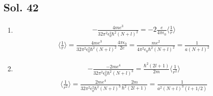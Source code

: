 \subsection*{Sol. 42}
\begin{enumerate}
    \item 
    \begin{align*}
        -\frac{4me^3}{32\pi^2\epsilon_0^2\hbar^2(N+l)^2}
        =-2\frac{e}{4\pi\epsilon_0}\langle
        \frac{1}{r}
        \rangle
    \end{align*}
    \begin{align*}
        \langle\frac{1}{r}\rangle
        =\frac{4me^3}{32\pi^2\epsilon_0^2\hbar^2(N+l)^2}
        \frac{4\pi\epsilon_0}{2e}=
        \frac{me^2}{4\pi^2\epsilon_0\hbar^2(N+l)^2}=\frac{1}{a(N+l)^2}
    \end{align*}
    \item 
    \begin{align*}
        -\frac{-2me^4}{32\pi^2\epsilon_0^2\hbar^2(N+l)^3}=
        \frac{\hbar^2(2l+1)}{2m}\langle\frac{1}{r^2}\rangle
    \end{align*}
    \begin{align*}
        \langle\frac{1}{r^2}\rangle
        =\frac{2me^4}{32\pi^2\epsilon_0^2\hbar^2(N+l)^3}
        \frac{2m}{\hbar^2(2l+1)}=\frac{1}{a^2(N+l)^3(l+1/2)}
    \end{align*}
\end{enumerate}

